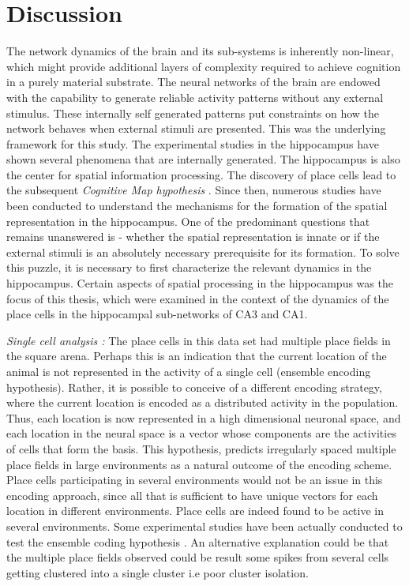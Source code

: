 \chapter{Discussion}

The network dynamics of the brain and its sub-systems is inherently non-linear, which might provide additional layers of complexity required to achieve cognition in a purely material substrate. The neural networks of the brain are endowed with the capability to generate reliable activity patterns without any external stimulus. These internally self generated patterns put constraints on how the network behaves when external stimuli are presented. This was the underlying framework for this study. The experimental studies in the hippocampus have shown several phenomena that are internally generated. The hippocampus is also the center for spatial information processing. The discovery of place cells \cite{O'Keefe1971a} lead to the subsequent \emph{Cognitive Map hypothesis} \cite{Street}. Since then, numerous studies have been conducted to understand the mechanisms for the formation of the spatial representation in the hippocampus. One of the predominant questions that remains unanswered is - whether the spatial representation is innate or if the external stimuli is an absolutely necessary prerequisite for its formation. To solve this puzzle, it is necessary to first characterize the relevant dynamics in the hippocampus. Certain aspects of spatial processing in the hippocampus was the focus of this thesis, which were examined in the context of the dynamics of the place cells in the hippocampal sub-networks of CA3 and CA1. 

\emph{Single cell analysis : }
The place cells in this data set had multiple place fields in the square arena. Perhaps this is an indication that the current location of the animal is not represented in the activity of a single cell (ensemble encoding hypothesis). Rather, it is possible to conceive of a different encoding strategy, where the current location is encoded as a distributed activity in the population. Thus, each location is now represented in a high dimensional neuronal space, and each location in the neural space is a vector whose components are the activities of cells that form the basis. This hypothesis, predicts irregularly spaced multiple place fields in large environments as a natural outcome of the encoding scheme. Place cells participating in several environments would not be an issue in this encoding approach, since all that is sufficient to have unique vectors for each location in different environments. Place cells are indeed found to be active in several environments\cite{Kubie1987}. Some experimental studies have been actually conducted to test the ensemble coding hypothesis \cite{Fenton2008}.  An alternative explanation could be that the multiple place fields observed could be result some spikes from several cells getting clustered into a single cluster i.e poor cluster isolation.

